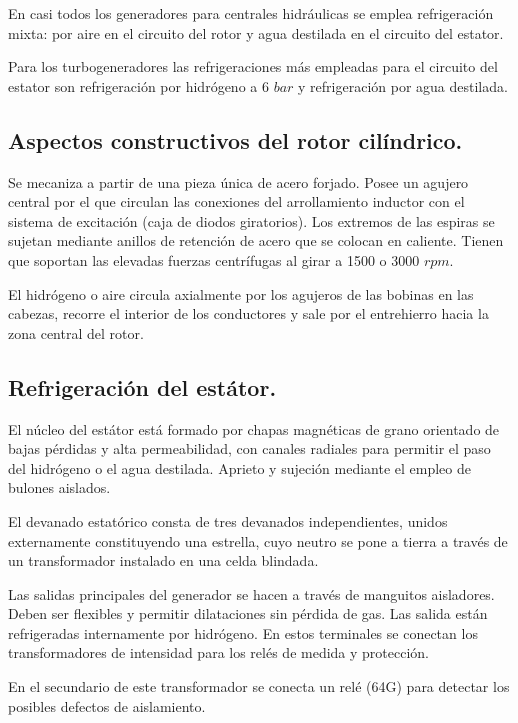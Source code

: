 			
			En casi todos los generadores para centrales hidráulicas se emplea refrigeración mixta: por
			aire en el circuito del rotor y agua destilada en el circuito del estator.
			
			
			Para los turbogeneradores las refrigeraciones más empleadas para el circuito del estator son refrigeración por hidrógeno a 6 $bar$ y refrigeración por agua destilada.
			
		\subsection{Aspectos constructivos del rotor cilíndrico.}
			Se mecaniza a partir de una pieza única de acero forjado. Posee un agujero central por el que circulan las conexiones del arrollamiento inductor con el sistema de excitación (caja de diodos giratorios). Los extremos de las espiras se sujetan mediante anillos de retención de acero que se colocan en caliente. Tienen que soportan las elevadas fuerzas centrífugas al girar a 1500 o 3000 $rpm$. 
			
			
			El hidrógeno o aire circula axialmente por los agujeros de las bobinas en las cabezas, recorre el interior de los conductores y sale por el entrehierro hacia la zona central del rotor.
			
		\subsection{Refrigeración del estátor.}
			El núcleo del estátor está formado por chapas magnéticas de grano orientado de bajas pérdidas y alta permeabilidad, con canales radiales para permitir el paso del hidrógeno o el agua destilada. Aprieto y sujeción
			mediante el empleo de bulones aislados.
			
			
			El devanado estatórico consta de tres devanados independientes, unidos externamente constituyendo una estrella, cuyo neutro se pone a tierra a través de un transformador instalado en una celda blindada. 
			
			
			Las salidas principales del generador se hacen a través de manguitos aisladores. Deben ser flexibles y permitir dilataciones sin pérdida de gas. Las salida están refrigeradas internamente por hidrógeno. En estos terminales se conectan los transformadores de intensidad para los relés de medida y protección.
			
			
			En el secundario de este transformador se conecta un relé (64G) para detectar los posibles defectos de aislamiento.
			
